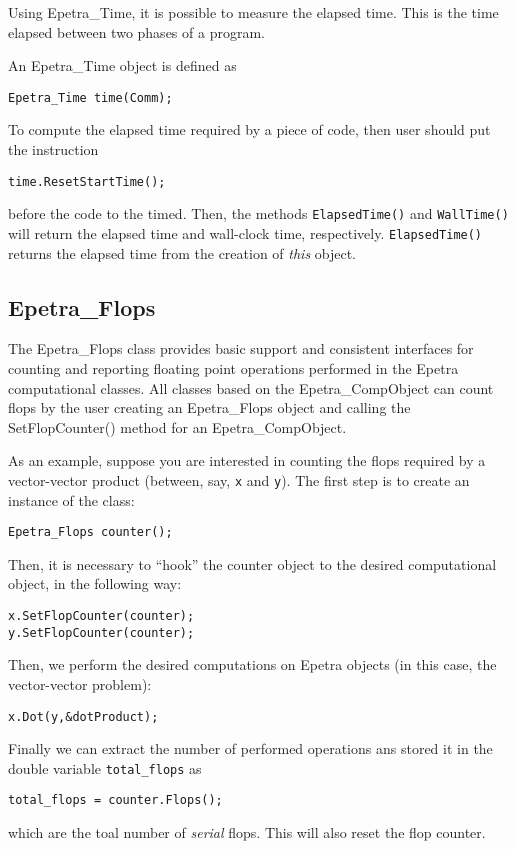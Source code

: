 Using Epetra\_Time, it is possible to measure the elapsed time. This is
the time elapsed between two phases of a program.

An Epetra\_Time object is defined as
\begin{verbatim}
Epetra_Time time(Comm);
\end{verbatim}
To compute the elapsed time required by a piece of code, then user
should put the instruction
\begin{verbatim}
time.ResetStartTime();
\end{verbatim}
before the code to the timed. Then, the methods \verb!ElapsedTime()! and
\verb!WallTime()! will return the elapsed time and wall-clock time,
respectively. \verb!ElapsedTime()!  returns the elapsed time from the
creation of {\sl this} object.


\subsection{Epetra\_Flops}
\label{sec:flops}

The Epetra\_Flops class provides basic support and consistent interfaces
for counting and reporting floating point operations performed in the
Epetra computational classes. All classes based on the
Epetra\_CompObject can count flops by the user creating an Epetra\_Flops
object and calling the SetFlopCounter() method for an
Epetra\_CompObject.

As an example, suppose you are interested in counting the flops required
by a vector-vector product (between, say, \verb!x! and \verb!y!).  The
first step is to create an instance of the class:
\begin{verbatim}
Epetra_Flops counter();
\end{verbatim}
Then, it is necessary to ``hook'' the counter object to the desired
computational object, in the following way:
\begin{verbatim}
x.SetFlopCounter(counter);
y.SetFlopCounter(counter);
\end{verbatim}
Then, we perform the desired computations on Epetra objects (in this
case, the vector-vector problem):
\begin{verbatim}
x.Dot(y,&dotProduct);
\end{verbatim}
Finally we can extract the number of performed operations ans stored it
in the double variable \verb!total_flops! as
\begin{verbatim}
total_flops = counter.Flops();
\end{verbatim}
which are the toal number of {\sl serial} flops. This will also reset
the flop counter.


